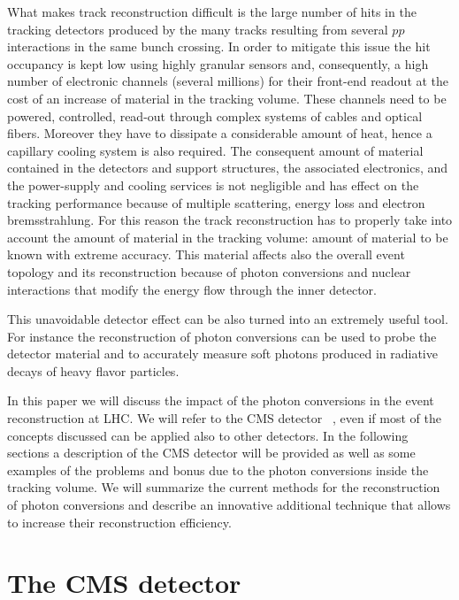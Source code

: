 \documentclass[a4paper]{jpconf}
\begin{document}
What makes  track reconstruction difficult is  
the large number of hits in the tracking detectors
produced by the many tracks resulting from several $pp$ interactions in the same bunch crossing. In order to mitigate this issue the hit occupancy is kept low using highly granular sensors and, consequently, a high number of electronic channels (several millions) for their front-end readout at the cost of an increase of material in the tracking volume. These channels need to be powered, controlled, read-out through  complex systems of cables and optical fibers. Moreover they have to dissipate a considerable amount of heat, hence a capillary cooling system is also required.
The consequent amount of material  contained in the detectors and support structures, the associated electronics, and the power-supply and cooling services is not negligible and has effect on the tracking performance because of multiple scattering, energy loss and electron bremsstrahlung. 
For this reason the track reconstruction has to properly take into account the amount of material in the tracking volume: amount of material to be known with extreme accuracy.  
This material  affects also the overall event topology and its reconstruction because of photon conversions and nuclear interactions that modify the energy flow through the inner detector.

This unavoidable detector effect   can be also turned into an extremely useful tool. For instance the reconstruction of photon conversions can be used to probe the detector material and to accurately measure soft photons produced in radiative decays of heavy flavor particles. %
 
In this paper we will discuss the impact of the photon conversions in the event reconstruction at LHC.  We will refer to the CMS detector~\cite{cms} , even if most of the concepts discussed can be applied also to other detectors. 
In the following sections a description of the CMS detector will be provided as well as some examples of the  problems and bonus due to the photon conversions inside the tracking volume.
We will summarize the current methods for the reconstruction of photon conversions and describe an innovative additional technique that allows to increase their reconstruction efficiency.


\section{The CMS detector}
\end{document}
